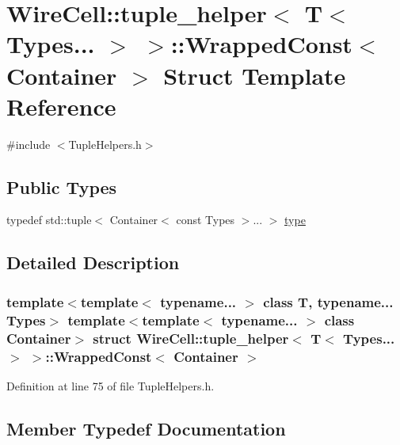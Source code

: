 \hypertarget{struct_wire_cell_1_1tuple__helper_3_01_t_3_01_types_8_8_8_01_4_01_4_1_1_wrapped_const}{}\section{Wire\+Cell\+:\+:tuple\+\_\+helper$<$ T$<$ Types... $>$ $>$\+:\+:Wrapped\+Const$<$ Container $>$ Struct Template Reference}
\label{struct_wire_cell_1_1tuple__helper_3_01_t_3_01_types_8_8_8_01_4_01_4_1_1_wrapped_const}


{\ttfamily \#include $<$Tuple\+Helpers.\+h$>$}

\subsection*{Public Types}
\begin{DoxyCompactItemize}
\item 
typedef std\+::tuple$<$ Container$<$ const Types $>$... $>$ \hyperlink{struct_wire_cell_1_1tuple__helper_3_01_t_3_01_types_8_8_8_01_4_01_4_1_1_wrapped_const_a6ddd5e1e18a972eafd2282972d5ca1a2}{type}
\end{DoxyCompactItemize}


\subsection{Detailed Description}
\subsubsection*{template$<$template$<$ typename... $>$ class T, typename... Types$>$\newline
template$<$template$<$ typename... $>$ class Container$>$\newline
struct Wire\+Cell\+::tuple\+\_\+helper$<$ T$<$ Types... $>$ $>$\+::\+Wrapped\+Const$<$ Container $>$}



Definition at line 75 of file Tuple\+Helpers.\+h.



\subsection{Member Typedef Documentation}
\mbox{\label{struct_wire_cell_1_1tuple__helper_3_01_t_3_01_types_8_8_8_01_4_01_4_1_1_wrapped_const_a6ddd5e1e18a972eafd2282972d5ca1a2}} 
